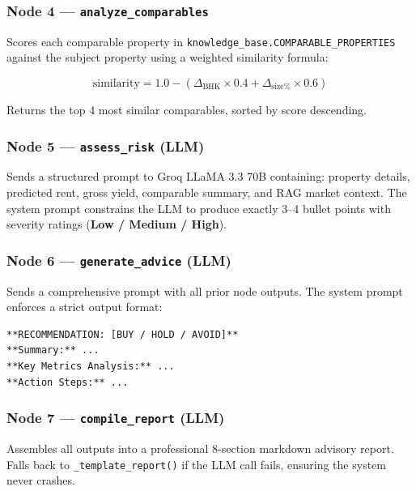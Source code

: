 \documentclass[12pt,a4paper]{article}
\newcommand{\code}[1]{\texttt{\small #1}}
\begin{document}
\subsubsection{Node 4 --- \texttt{analyze\_comparables}}

Scores each comparable property in \code{knowledge\_base.COMPARABLE\_PROPERTIES} against the subject property using a weighted similarity formula:

\begin{equation}
\text{similarity} = 1.0 - \left(\Delta_{\text{BHK}} \times 0.4 + \Delta_{\text{size\%}} \times 0.6\right)
\end{equation}

Returns the top 4 most similar comparables, sorted by score descending.

\subsubsection{Node 5 --- \texttt{assess\_risk} (LLM)}

Sends a structured prompt to Groq LLaMA 3.3 70B containing: property details, predicted rent, gross yield, comparable summary, and RAG market context. The system prompt constrains the LLM to produce exactly 3--4 bullet points with severity ratings (\textbf{Low / Medium / High}).

\subsubsection{Node 6 --- \texttt{generate\_advice} (LLM)}

Sends a comprehensive prompt with all prior node outputs. The system prompt enforces a strict output format:

\begin{lstlisting}[language={}, caption={Enforced output format for Node 6}]
**RECOMMENDATION: [BUY / HOLD / AVOID]**
**Summary:** ...
**Key Metrics Analysis:** ...
**Action Steps:** ...
\end{lstlisting}

\subsubsection{Node 7 --- \texttt{compile\_report} (LLM)}

Assembles all outputs into a professional 8-section markdown advisory report. Falls back to \code{\_template\_report()} if the LLM call fails, ensuring the system never crashes.
\end{document}
